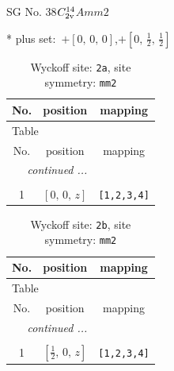 \documentclass[fleqn,8pt]{jsarticle}
\begin{document}
\setcounter{MaxMatrixCols}{32}

\renewcommand{\tablename}{Table~}
\renewcommand{\figurename}{Figure~}
\begin{center}
\LARGE
SG No. 38\quad$C_{\rm 2v}^{14}$\quad$Amm2$\quad[ orthorhombic ]
\end{center}
* plus set:\,\,\,$+\left[ 0,\, 0,\, 0 \right]$,\quad $+\left[ 0,\, \frac{1}{2},\, \frac{1}{2} \right]$
\renewcommand{\arraystretch}{1.2}
\begin{longtable}{ccc}
\caption{Wyckoff site: {\tt 2a}, site symmetry: {\tt mm2}}
 \\
 \hline \hline
No. & position & mapping \\ \hline \endfirsthead

\multicolumn{2}{l}{\tablename\ \thetable{}} \\
 \hline \hline
No. & position & mapping \\ \hline \endhead

 \hline \hline
\multicolumn{2}{r}{\footnotesize\it continued ...} \\ \endfoot

 \hline \hline
\multicolumn{2}{r}{} \\ \endlastfoot

1 & $\left[ 0,\, 0,\, z \right]$ & {\tt [1,2,3,4]} \\
\end{longtable}
\renewcommand{\arraystretch}{1.2}
\begin{longtable}{ccc}
\caption{Wyckoff site: {\tt 2b}, site symmetry: {\tt mm2}}
 \\
 \hline \hline
No. & position & mapping \\ \hline \endfirsthead

\multicolumn{2}{l}{\tablename\ \thetable{}} \\
 \hline \hline
No. & position & mapping \\ \hline \endhead

 \hline \hline
\multicolumn{2}{r}{\footnotesize\it continued ...} \\ \endfoot

 \hline \hline
\multicolumn{2}{r}{} \\ \endlastfoot

1 & $\left[ \frac{1}{2},\, 0,\, z \right]$ & {\tt [1,2,3,4]} \\
\end{longtable}
\renewcommand{\arraystretch}{1.2}
\end{document}
